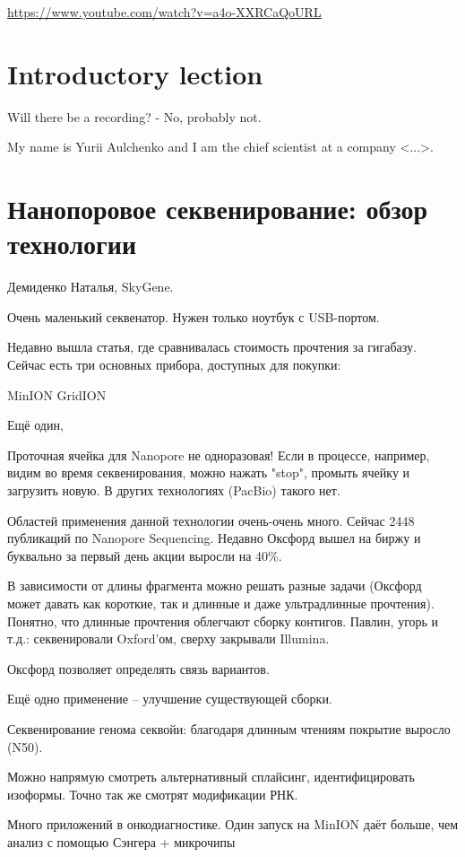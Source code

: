 \documentclass[main.tex]{subfiles}
\begin{document}
\url{https://www.youtube.com/watch?v=a4o-XXRCaQoURL}

\section{ Introductory lection }

Will there be a recording? - No, probably not.

My name is Yurii Aulchenko and I am the chief scientist at a company <...>.

\section{Нанопоровое секвенирование: обзор технологии}

Демиденко Наталья, SkyGene.

Очень маленький секвенатор.
Нужен только ноутбук с USB-портом.

Недавно вышла статья, где сравнивалась стоимость прочтения за гигабазу.
Сейчас есть три основных прибора, доступных для покупки:

MinION
GridION

Ещё один,

Проточная ячейка для Nanopore не одноразовая!
Если в процессе, например, видим во время секвенирования, можно нажать "stop", промыть ячейку и загрузить новую.
В других технологиях (PacBio) такого нет.

Областей применения данной технологии очень-очень много.
Сейчас 2448 публикаций по Nanopore Sequencing.
Недавно Оксфорд вышел на биржу и буквально за первый день акции выросли на 40\%.

В зависимости от длины фрагмента можно решать разные задачи (Оксфорд может давать как короткие, так и длинные и даже ультрадлинные прочтения).
Понятно, что длинные прочтения облегчают сборку контигов.
Павлин, угорь и т.д.: секвенировали Oxford'ом, сверху закрывали Illumina.

Оксфорд позволяет определять связь вариантов.

Ещё одно применение -- улучшение существующей сборки.

Секвенирование генома секвойи: благодаря длинным чтениям покрытие выросло (N50).

Можно напрямую смотреть альтернативный сплайсинг, идентифицировать изоформы.
Точно так же смотрят модификации РНК.

Много приложений в онкодиагностике.
Один запуск на MinION даёт больше, чем анализ с помощью Сэнгера + микрочипы
\end{document}
